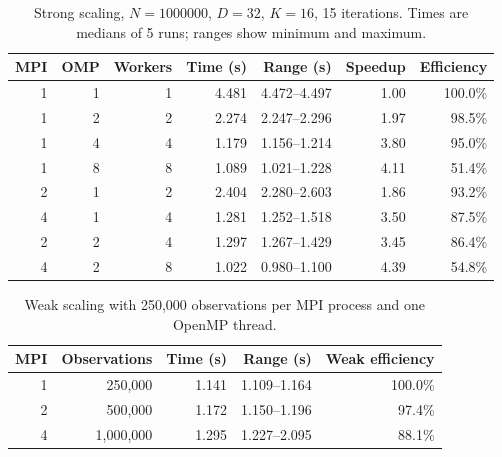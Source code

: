 \begin{table}[H]\centering\small
\caption{Strong scaling, $N=1000000$, $D=32$, $K=16$, 15 iterations. Times are medians of 5 runs; ranges show minimum and maximum.}
\begin{tabular}{rrrrrrr}\toprule
MPI & OMP & Workers & Time (s) & Range (s) & Speedup & Efficiency \\
\midrule
1 & 1 & 1 & 4.481 & 4.472--4.497 & 1.00 & 100.0\% \\
1 & 2 & 2 & 2.274 & 2.247--2.296 & 1.97 & 98.5\% \\
1 & 4 & 4 & 1.179 & 1.156--1.214 & 3.80 & 95.0\% \\
1 & 8 & 8 & 1.089 & 1.021--1.228 & 4.11 & 51.4\% \\
2 & 1 & 2 & 2.404 & 2.280--2.603 & 1.86 & 93.2\% \\
4 & 1 & 4 & 1.281 & 1.252--1.518 & 3.50 & 87.5\% \\
2 & 2 & 4 & 1.297 & 1.267--1.429 & 3.45 & 86.4\% \\
4 & 2 & 8 & 1.022 & 0.980--1.100 & 4.39 & 54.8\% \\
\bottomrule\end{tabular}\label{tab:strong}\end{table}
\begin{table}[H]\centering\small
\caption{Weak scaling with 250,000 observations per MPI process and one OpenMP thread.}
\begin{tabular}{rrrrr}\toprule
MPI & Observations & Time (s) & Range (s) & Weak efficiency \\
\midrule
1 & 250,000 & 1.141 & 1.109--1.164 & 100.0\% \\
2 & 500,000 & 1.172 & 1.150--1.196 & 97.4\% \\
4 & 1,000,000 & 1.295 & 1.227--2.095 & 88.1\% \\
\bottomrule\end{tabular}\label{tab:weak}\end{table}
